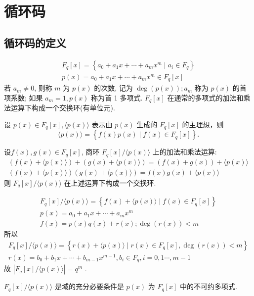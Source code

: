 \chapter{循环码}
\section{ 循环码的定义}
$$
\begin{array}{l}
F_{q}[x]=\left\{a_{0}+a_{1} x+\cdots+a_{m} x^{m} \mid a_{i} \in F_{q}\right\} \\
p(x)=a_{0}+a_{1} x+\cdots+a_{m} x^{m} \in F_{q}[x]
\end{array}
$$
若 $ a_{m} \neq 0 $, 则称 $ m $ 为 $ p(x) $ 的次数, 记为 $ \operatorname{deg}(p(x)) ; a_{m} $ 称为 $ p(x) $ 的首项系数; 如果 $ a_{m}=1, p(x) $ 称为首 1 多项式. $ F_{q}[x] $ 在通常的多项式的加法和乘法运算下构成一个交换环(有单位元).

设 $ p(x) \in F_{q}[x],\langle p(x)\rangle $ 表示由 $ p(x) $ 生成的 $ F_{q}[x] $ 的主理想，则 
$$ \langle p(x)\rangle=\left\{f(x) p(x) \mid f(x) \in F_{q}[x]\right\}. $$

设$f(x),g(x)\in F_{q}[x]$, 商环 $ F_{q}[x] /\langle p(x)\rangle $ 上的加法和乘法运算:
$$
\begin{array}{l}
(f(x)+\langle p(x)\rangle)+(g(x)+\langle p(x)\rangle)=(f(x)+g(x))+\langle p(x)\rangle \\
(f(x)+\langle p(x)\rangle)(g(x)+\langle p(x)\rangle)=f(x) g(x)+\langle p(x)\rangle
\end{array}
$$
则 $ F_{q}[x] /\langle p(x)\rangle $ 在上述运算下构成一个交换环.

$$
\begin{array}{l}
F_{q}[x] /\langle p(x)\rangle=\left\{f(x)+\langle p(x)\rangle \mid f(x) \in F_{q}[x]\right\} \\
p(x)=a_{0}+a_{1} x+\cdots+a_{m} x^{m} \\
f(x)=p(x) q(x)+r(x) ; \operatorname{deg}(r(x))<m
\end{array}
$$
所以
$$
\begin{array}{l}
F_{q}[x] /\langle p(x)\rangle=\left\{r(x)+\langle p(x)\rangle \mid r(x) \in F_{q}[x],  \operatorname{deg}(r(x))<m\right\} \\
r(x)=b_{0}+b_{1} x+\cdots+b_{m-1} x^{m-1}, b_{i} \in F_{q} , i=0,1 \cdots, m-1 
\end{array}
$$
 故 $\left|F_{q}[x] /\langle p(x)\rangle\right|=q^{m}$ .

\begin{theorem}
    $ F_{q}[x] /\langle p(x)\rangle $ 是域的充分必要条件是 $ p(x) $ 为 $ F_{q}[x] $ 中的不可约多项式.
\end{theorem}

